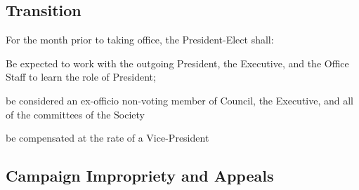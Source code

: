 \subsection{Transition}

\begin{longenum}[ label*=\thesubsection.\arabic*., align=left]
	\item For the month prior to taking office, the President-Elect shall:
	 \begin{longenum}[ label*=\thesubsection.\arabic*., align=left]
	\item Be expected to work with the outgoing President, the Executive, and the Office Staff to learn the role of President;
	\item be considered an ex-officio non-voting member of Council, the Executive, and all of the committees of the Society
	\item  be compensated at the rate of a Vice-President
	 

\end{longenum}

\end{longenum}

\subsection{Campaign Impropriety and Appeals}

